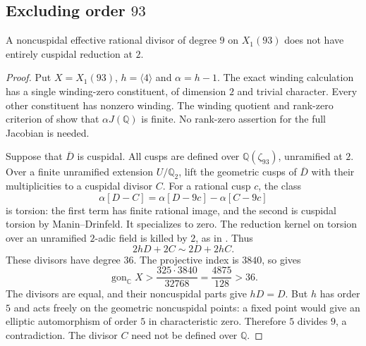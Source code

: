 \subsection{Excluding order $93$}
\begin{lemma}\label{lem:nonic93-allbad}
A noncuspidal effective rational divisor of degree $9$ on $X_1(93)$
does not have entirely cuspidal reduction at $2$.
\end{lemma}
\begin{proof}
Put $X=X_1(93)$, $h=\langle4\rangle$ and $\alpha=h-1$.
The exact winding calculation has a single winding-zero constituent,
of dimension $2$ and trivial character. Every other constituent has
nonzero winding. The winding quotient and rank-zero criterion of
\cite[Section~3]{DEHMZ} show that $\alpha J(\mathbb Q)$ is finite.
No rank-zero assertion for the full Jacobian is needed.

Suppose that $\overline D$ is cuspidal. All cusps are defined over
$\mathbb Q(\zeta_{93})$, unramified at $2$. Over a finite unramified
extension $U/\mathbb Q_2$, lift the geometric cusps of $\overline D$
with their multiplicities to a cuspidal divisor $C$. For a rational
cusp $c$, the class
\[
 \alpha[D-C]=\alpha[D-9c]-\alpha[C-9c]
\]
is torsion: the first term has finite rational image, and the second
is cuspidal torsion by Manin--Drinfeld. It specializes to zero.
The reduction kernel on torsion over an unramified $2$-adic field is
killed by $2$, as in \cite[proof of Proposition~3.4]{DKSS}. Thus
\[
 2hD+2C\sim2D+2hC.
\]
These divisors have degree $36$. The projective index is $3840$, so
\cite[(2.1)]{NV} gives
\[
 \operatorname{gon}_{\mathbb C}X>
 \frac{325\cdot3840}{32768}=\frac{4875}{128}>36.
\]
The divisors are equal, and their noncuspidal parts give $hD=D$.
But $h$ has order $5$ and acts freely on the geometric noncuspidal
points: a fixed point would give an elliptic automorphism of order
$5$ in characteristic zero. Therefore $5$ divides $9$, a contradiction.
The divisor $C$ need not be defined over $\mathbb Q$.
\end{proof}

